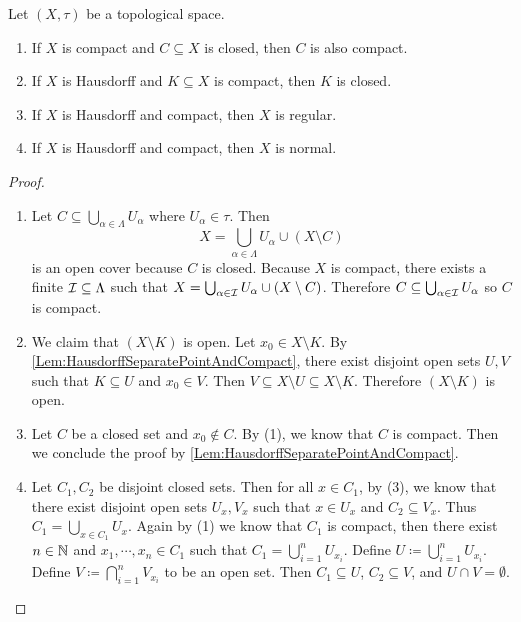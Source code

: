 \documentclass[screen]{techreport}
\numberwithin{equation}{section}
\begin{document}
\begin{proposition}\label{Prop:SeveralPropertiesOfCompactness}
	Let $(X,\tau)$ be a topological space.
	\begin{enumerate}
		\item If $X$ is compact and $C \subseteq X$ is closed, then $C$ is also compact.
		\item If $X$ is Hausdorff and $K \subseteq X$ is compact, then $K$ is closed.
		\item If $X$ is Hausdorff and compact, then $X$ is regular.
		\item If $X$ is Hausdorff and compact, then $X$ is normal.
	\end{enumerate}
\end{proposition}
\begin{proof}\
	\begin{enumerate}
		\item Let $C \subseteq \bigcup_{\alpha \in \Lambda} U_\alpha$ where $U_\alpha \in \tau$. Then
		\[
		X = \bigcup_{\alpha \in \Lambda} U_\alpha \cup (X \setminus C)
		\]
		is an open cover because $C$ is closed.
		Because $X$ is compact, there exists a finite $\mathcal{I} \subseteq \Lambda$ such that $X = \bigcup_{\alpha \in \mathcal{I}} U_\alpha \cup (X \setminus C)$.
		Therefore $C \subseteq \bigcup_{\alpha \in \mathcal{I}} U_\alpha$ so $C$ is compact.
		
		\item We claim that $(X \setminus K)$ is open.
		Let $x_0 \in X \setminus K$.
		By \cref{Lem:HausdorffSeparatePointAndCompact}, there exist disjoint open sets $U,V$ such that $K \subseteq U$ and $x_0 \in V$.
		Then $V \subseteq X \setminus U \subseteq X \setminus K$.
		Therefore $(X \setminus K)$ is open.
		
		\item Let $C$ be a closed set and $x_0 \not\in C$.
		By (1), we know that $C$ is compact.
		Then we conclude the proof by \cref{Lem:HausdorffSeparatePointAndCompact}.
		
		\item Let $C_1,C_2$ be disjoint closed sets.
		Then for all $x \in C_1$, by (3), we know that there exist disjoint open sets $U_x,V_x$ such that $x \in U_x$ and $C_2 \subseteq V_x$.
		Thus $C_1 = \bigcup_{x \in C_1} U_x$.
		Again by (1) we know that $C_1$ is compact, then there exist $n \in \mathbb{N}$ and $x_1,\cdots,x_n \in C_1$ such that $C_1 = \bigcup_{i=1}^n U_{x_i}$.
		Define $U \coloneqq \bigcup_{i=1}^n U_{x_i}$.
		Define $V \coloneqq \bigcap_{i=1}^n V_{x_i}$ to be an open set.
		Then $C_1 \subseteq U$, $C_2 \subseteq V$, and $U \cap V =\emptyset$.
	\end{enumerate}
\end{proof}
\end{document}

